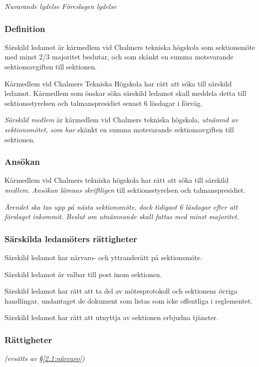 \documentclass{article}
\newenvironment{lydelse}
    {\begin{paracol}{2}%
        \emph{Nuvarande lydelse}%
        \switchcolumn%
        \emph{Föreslagen lydelse}%
    \end{paracol}%
    \begin{enumerate}[label=\thesubsection.\arabic*]%
    \begin{paracol}{2}%
    }{\end{paracol}\end{enumerate}}
\newcommand{\itemb}{\item[\textbullet]}
\begin{document}
\begin{lydelse}%
    \subsubsection*{Definition}
    \itemb Särskild ledamot är kårmedlem vid Chalmers tekniska högskola
  som sektionsmöte med minst 2/3 majoritet beslutar, och som skänkt en summa motsvarande sektionsavgiften till sektionen.
  
  \itemb Kårmedlem vid Chalmers Tekniska Högskola har rätt att söka till särskild ledamot. Kårmedlem som önskar söka särskild ledamot skall meddela detta till sektionsstyrelsen och talmanspresidiet senast 6 läsdagar i förväg.

\switchcolumn
    \setcounter{enumi}{0}
    \item \emph{Särskild medlem} är kårmedlem vid Chalmers tekniska högskola, \emph{utnämnd av sektionsmötet, som har }skänkt en summa motsvarande sektionsavgiften till sektionen.
    
    \subsubsection*{Ansökan}
    \item Kårmedlem vid Chalmers tekniska högskola har rätt att söka till särskild \emph{medlem}.
        \emph{Ansökan lämnas skriftligen} till sektionsstyrelsen och talmanspresidiet.
    
    \item \emph{Ärendet ska tas upp på nästa sektionsmöte, dock tidigast 6 läsdagar efter att förslaget inkommit.
        Beslut om utnämnande skall fattas med minst  majoritet.}
    
\switchcolumn*
    \subsubsection*{Särskilda ledamöters rättigheter}%
    \itemb Särskild ledamot har närvaro- och yttranderätt på
   sektionsmöte.

  \itemb Särskild ledamot är valbar till post inom sektionen.

   \itemb Särskild ledamot har rätt att ta del av mötesprotokoll och
   sektionens övriga handlingar, undantaget de dokument som listas som icke offentliga i reglementet.

  \itemb Särskild ledamot har rätt att utnyttja av sektionen erbjudna
   tjänster.
    
\switchcolumn
    \subsubsection*{Rättigheter}%
    \emph{(ersätts av \S \ref{2.1:närvaro})}


\end{lydelse}
\end{document}
